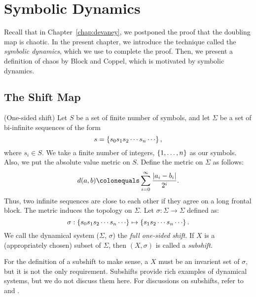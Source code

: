 \documentclass[10pt,twoside]{book}
\begin{document}
\chapter{Symbolic Dynamics}
\label{chap:symbolic}
Recall that in Chapter~\ref{chap:devaney}, we postponed the proof that the doubling map is chaotic.
In the present chapter, we introduce the technique called the \textit{symbolic dynamics}, which we use to complete the proof.
Then, we present a definition of chaos by Block and Coppel, which is motivated by symbolic dynamics.

\section{The Shift Map}
\begin{definition}
  (One-sided shift)
  Let $S$ be a set of finite number of symbols, and let $\Sigma$ be a set of bi-infinite sequences of the form
  \begin{equation*}
    s = \set{ s_0 s_1 s_2 \cdots s_n \cdots },
  \end{equation*}
  where $s_i \in S$.
  We take a finite number of integers, $\left \{ 1, \ldots, n \right \}$ as our symbols.
  Also, we put the absolute value metric on $S$.
  Define the metric on $\Sigma$ as follows:
  \begin{equation*}
    d(a,b) \ceq \sum\limits_{i = 0}^{\infty} \frac{\abs{a_i - b_i}}{2^i}.
  \end{equation*}
  Thus, two infinite sequences are close to each other if they agree on a long frontal block.
  The metric induces the topology on $\Sigma$.
  Let $\sigma: \Sigma \to \Sigma$ defined as:
  \begin{equation*}
    \sigma: \set{ s_0 s_1 s_2 \cdots s_n \cdots } 
    \mapsto 
    \set{ s_1 s_2 \cdots s_n \cdots }.
  \end{equation*}
  We call the dynamical system ($\Sigma$, $\sigma$) the \textit{full one-sided shift}.
  If $X$ is a (appropriately chosen) subset of $\Sigma$, then $(X, \sigma)$ is called a \textit{subshift}.
\end{definition}
For the definition of a subshift to make sense, a $X$ must be an invarient set of $\sigma$, but it is not the only requirement.
Subshifts provide rich examples of dynamical systems, but we do not discuss them here.
For discussions on subshifts, refer to \citet{kitchens} and \citet{lind}.
\end{document}
